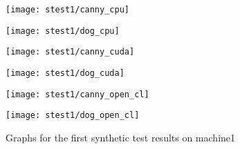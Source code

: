 \begin{table}[H]
\centering
{}
\caption{Test plans for the  Synthetic tester for \ac{DoG} algorithm}
\label{tab:sync_pic_dog}
\end{table}


\begin{figure}[H]
\centering
\begin{minipage}[t]{.49\textwidth}
\centering
\texttt{[image: stest1/canny\_cpu]}
\end{minipage}
\begin{minipage}[t]{.49\textwidth}
\centering
\texttt{[image: stest1/dog\_cpu]}
\end{minipage}
\begin{minipage}[t]{.49\textwidth}
\centering
\texttt{[image: stest1/canny\_cuda]}
\end{minipage}
\begin{minipage}[t]{.49\textwidth}
\centering
\texttt{[image: stest1/dog\_cuda]}
\end{minipage}
\begin{minipage}[t]{.49\textwidth}
\centering
\texttt{[image: stest1/canny\_open\_cl]}
\end{minipage}
\begin{minipage}[t]{.49\textwidth}
\centering
\texttt{[image: stest1/dog\_open\_cl]}
\end{minipage}
\caption{Graphs for the first synthetic test results on machine1}
\label{fig:test1s}
\end{figure}

